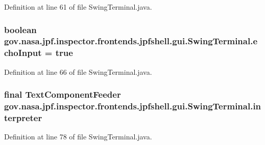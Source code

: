 Definition at line 61 of file Swing\+Terminal.\+java.

\subsubsection[{\texorpdfstring{echo\+Input}{echoInput}}]{\setlength{\rightskip}{0pt plus 5cm}boolean gov.\+nasa.\+jpf.\+inspector.\+frontends.\+jpfshell.\+gui.\+Swing\+Terminal.\+echo\+Input = true\hspace{0.3cm}{\ttfamily [private]}}\hypertarget{classgov_1_1nasa_1_1jpf_1_1inspector_1_1frontends_1_1jpfshell_1_1gui_1_1_swing_terminal_ad07d8fb02db861cc5f529dc87b0d6d77}{}\label{classgov_1_1nasa_1_1jpf_1_1inspector_1_1frontends_1_1jpfshell_1_1gui_1_1_swing_terminal_ad07d8fb02db861cc5f529dc87b0d6d77}


Definition at line 66 of file Swing\+Terminal.\+java.

\subsubsection[{\texorpdfstring{interpreter}{interpreter}}]{\setlength{\rightskip}{0pt plus 5cm}final {\bf Text\+Component\+Feeder} gov.\+nasa.\+jpf.\+inspector.\+frontends.\+jpfshell.\+gui.\+Swing\+Terminal.\+interpreter\hspace{0.3cm}{\ttfamily [private]}}\hypertarget{classgov_1_1nasa_1_1jpf_1_1inspector_1_1frontends_1_1jpfshell_1_1gui_1_1_swing_terminal_a87d4f7277418a07e4281823b9e90e302}{}\label{classgov_1_1nasa_1_1jpf_1_1inspector_1_1frontends_1_1jpfshell_1_1gui_1_1_swing_terminal_a87d4f7277418a07e4281823b9e90e302}


Definition at line 78 of file Swing\+Terminal.\+java.

